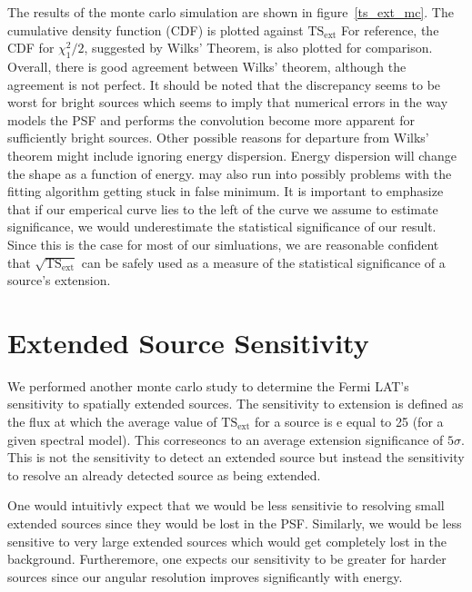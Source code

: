 \documentclass[preprint]{aastex}
\newcommand{\tsext}{{\ensuremath{\text{TS}_\text{ext}}}\xspace}
\newcommand{\pointlike}{\text{\em pointlike}\xspace}
\begin{document}
The results of the monte carlo simulation are shown in
figure~\ref{ts_ext_mc}.  The cumulative density function (CDF) is plotted
against $\tsext$ For reference, the CDF for $\chi^2_1/2$,
suggested by Wilks' Theorem, is also plotted for comparison. Overall,
there is good agreement between Wilks' theorem, although the agreement is
not perfect.  It should be noted that the discrepancy seems to be worst
for bright sources which seems to imply that numerical errors in the
way \pointlike models the PSF and performs the convolution become more
apparent for sufficiently bright sources.  Other possible reasons for
departure from Wilks' theorem might include \pointlike ignoring energy
dispersion. Energy dispersion will change the shape as a function of
energy. \pointlike may also run into possibly problems with the fitting
algorithm getting stuck in false minimum. It is important to emphasize
that if
our emperical curve lies to the left of the curve we assume to estimate
significance, we would underestimate the statistical significance of
our result. Since this is the case for most of our simluations, we are
reasonable confident that $\sqrt{\tsext}$ can be safely
used as a measure of the statistical significance of a source's extension.

\section{Extended Source Sensitivity}\label{extension_sensitivity}

We performed another monte carlo study to determine the Fermi LAT's
sensitivity to spatially extended sources. The sensitivity to extension
is defined as the flux at which 
the average value of $\tsext$ for a source is 
e equal to 25 (for a given spectral model). This correseoncs
to an average extension significance of $5\sigma$.  This is not the
sensitivity to detect an extended source but instead the sensitivity to
resolve an already detected source as being extended.  

One would intuitivly expect that we would be less sensitivie to resolving
small extended sources since they would be lost in the PSF.  Similarly,
we would be less sensitive to very large extended sources which would
get completely lost in the background. Furtheremore, one expects our
sensitivity to be greater for harder sources since our angular resolution
improves significantly with energy.
\end{document}
